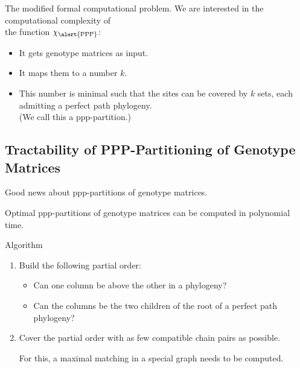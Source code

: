 \documentclass{beamer}
\begin{document}
\begin{frame}{The modified formal computational problem.}
  We are interested in the computational complexity of \\
  the function $\chi_{\alert{\operatorname{PPP}}}$:
  \begin{itemize}
  \item It gets genotype matrices as input.
  \item It maps them to a number $k$.
  \item This number is minimal such that the sites can be
    covered by $k$ sets, each admitting a perfect \alert{path} phylogeny.
    \\
    (We call this a ppp-partition.)
  \end{itemize}
\end{frame}



\subsection{Tractability of PPP-Partitioning of Genotype Matrices}

\begin{frame}{Good news about ppp-partitions of genotype matrices.}
  \begin{theorem}
    \alert{Optimal ppp-partitions of genotype matrices} can be
    computed in \alert{polynomial time}. 
  \end{theorem}
  \begin{block}{Algorithm}
    \begin{enumerate}
    \item Build the following partial order:
      \begin{itemize}
      \item Can one column be above the other in a phylogeny?
      \item Can the columns be the two children of the root of a
        perfect path phylogeny?
      \end{itemize}
    \item Cover the partial order with as few compatible chain pairs 
      as possible. 

      For this, a maximal matching in a special graph needs to be
      computed.
    \end{enumerate}
  \end{block}
  \hyperlink{algorithm<1>}{}
  \hypertarget{return}{}
\end{frame}
\end{document}
